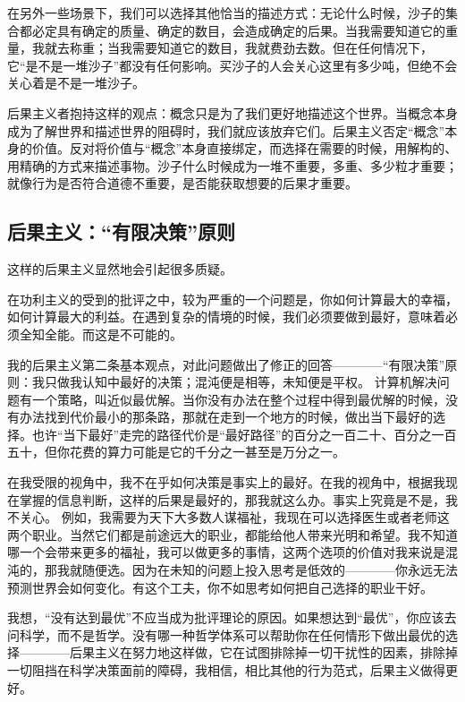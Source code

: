 \documentclass[10pt]{article}
\begin{document}
    在另外一些场景下，我们可以选择其他恰当的描述方式：无论什么时候，沙子的集合都必定具有确定的质量、确定的数目，会造成确定的后果。当我需要知道它的重量，我就去称重；当我需要知道它的数目，我就费劲去数。但在任何情况下，它“是不是一堆沙子”都没有任何影响。买沙子的人会关心这里有多少吨，但绝不会关心着是不是一堆沙子。
   
    后果主义者抱持这样的观点：概念只是为了我们更好地描述这个世界。当概念本身成为了解世界和描述世界的阻碍时，我们就应该放弃它们。后果主义否定“概念”本身的价值。反对将价值与“概念”本身直接绑定，而选择在需要的时候，用解构的、用精确的方式来描述事物。沙子什么时候成为一堆不重要，多重、多少粒才重要；就像行为是否符合道德不重要，是否能获取想要的后果才重要。

 \subsection {后果主义：“有限决策”原则}
    
    这样的后果主义显然地会引起很多质疑。
    
    在功利主义的受到的批评之中，较为严重的一个问题是，你如何计算最大的幸福，如何计算最大的利益。在遇到复杂的情境的时候，我们必须要做到最好，意味着必须全知全能。而这是不可能的。
    
    我的后果主义第二条基本观点，对此问题做出了修正的回答————“有限决策”原则：我只做我认知中最好的决策；混沌便是相等，未知便是平权。
    计算机解决问题有一个策略，叫近似最优解。当你没有办法在整个过程中得到最优解的时候，没有办法找到代价最小的那条路，那就在走到一个地方的时候，做出当下最好的选择。也许“当下最好”走完的路径代价是“最好路径”的百分之一百二十、百分之一百五十，但你花费的算力可能是它的千分之一甚至是万分之一。

    在我受限的视角中，我不在乎如何决策是事实上的最好。在我的视角中，根据我现在掌握的信息判断，这样的后果是最好的，那我就这么办。事实上究竟是不是，我不关心。
    例如，我需要为天下大多数人谋福祉，我现在可以选择医生或者老师这两个职业。当然它们都是前途远大的职业，都能给他人带来光明和希望。我不知道哪一个会带来更多的福祉，我可以做更多的事情，这两个选项的价值对我来说是混沌的，那我就随便选。因为在未知的问题上投入思考是低效的————你永远无法预测世界会如何变化。有这个工夫，你不如思考如何把自己选择的职业干好。

    我想，“没有达到最优”不应当成为批评理论的原因。如果想达到“最优”，你应该去问科学，而不是哲学。没有哪一种哲学体系可以帮助你在任何情形下做出最优的选择————后果主义在努力地这样做，它在试图排除掉一切干扰性的因素，排除掉一切阻挡在科学决策面前的障碍，我相信，相比其他的行为范式，后果主义做得更好。
    
\end{document}

